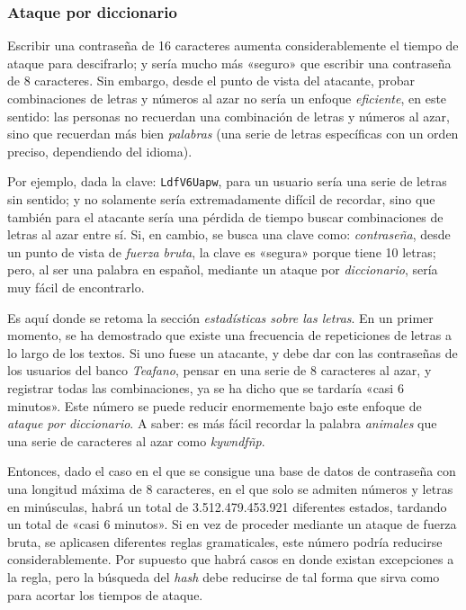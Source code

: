 \documentclass[12pt,a4paper,twoside]{book}
\begin{document}
\subsubsection{Ataque por diccionario}
Escribir una contraseña de 16 caracteres aumenta considerablemente el tiempo de ataque para descifrarlo; y sería mucho más «seguro» que escribir una contraseña de 8 caracteres. Sin embargo, desde el punto de vista del atacante, probar combinaciones de letras y números al azar no sería un enfoque \textit{eficiente}, en este sentido: las personas no recuerdan una combinación de letras y números al azar, sino que recuerdan más bien \textit{palabras} (una serie de letras específicas con un orden preciso, dependiendo del idioma).

Por ejemplo, dada la clave: \texttt{LdfV6Uapw}, para un usuario sería una serie de letras sin sentido; y no solamente sería extremadamente difícil de recordar, sino que también para el atacante sería una pérdida de tiempo buscar combinaciones de letras al azar entre sí. Si, en cambio, se busca una clave como: \textit{contraseña}, desde un punto de vista de \textit{fuerza bruta}, la clave es «segura» porque tiene 10 letras; pero, al ser una palabra en español, mediante un ataque por \textit{diccionario}, sería muy fácil de encontrarlo.

Es aquí donde se retoma la sección \textit{estadísticas sobre las letras}. En un primer momento, se ha demostrado que existe una frecuencia de repeticiones de letras a lo largo de los textos. Si uno fuese un atacante, y debe dar con las contraseñas de los usuarios del banco \textit{Teafano}, pensar en una serie de 8 caracteres al azar, y registrar todas las combinaciones, ya se ha dicho que se tardaría «casi 6 minutos». Este número se puede reducir enormemente bajo este enfoque de \textit{ataque por diccionario}. A saber: es más fácil recordar la palabra \textit{animales} que una serie de caracteres al azar como \textit{kywndfñp}.

Entonces, dado el caso en el que se consigue una base de datos de contraseña con una longitud máxima de 8 caracteres, en el que solo se admiten números y letras en minúsculas, habrá un total de 3.512.479.453.921 diferentes estados, tardando un total de «casi 6 minutos». Si en vez de proceder mediante un ataque de fuerza bruta, se aplicasen diferentes reglas gramaticales, este número podría reducirse considerablemente. Por supuesto que habrá casos en donde existan excepciones a la regla, pero la búsqueda del \textit{hash} debe reducirse de tal forma que sirva como para acortar los tiempos de ataque. 
\end{document}
